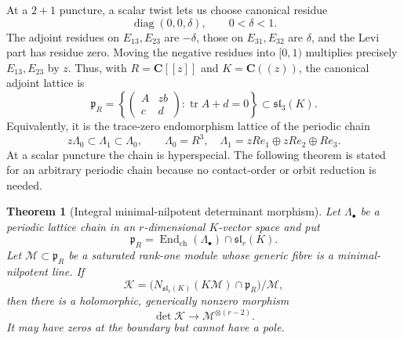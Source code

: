 \documentclass[11pt]{article}
\newtheorem{theorem}{Theorem}[section]
\theoremstyle{definition}
\newcommand{\C}{\mathbf C}
\newcommand{\Mcal}{\mathcal M}
\newcommand{\Kcal}{\mathcal K}
\newcommand{\End}{\operatorname{End}}
\newcommand{\tr}{\operatorname{tr}}
\begin{document}
At a $2+1$ puncture, a scalar twist lets us choose canonical residue
\[
 \operatorname{diag}(0,0,\delta),\qquad 0<\delta<1.
\]
The adjoint residues on $E_{13},E_{23}$ are $-\delta$, those on
$E_{31},E_{32}$ are $\delta$, and the Levi part has residue zero.  Moving the
negative residues into $[0,1)$ multiplies precisely $E_{13},E_{23}$ by $z$.
Thus, with $R=\C[[z]]$ and $K=\C((z))$, the canonical adjoint lattice is
\[
 \mathfrak p_R=
 \left\{
 \begin{pmatrix}A&zb\\c&d\end{pmatrix}:\tr A+d=0
 \right\}\subset\mathfrak{sl}_3(K).
\]
Equivalently, it is the trace-zero endomorphism lattice of the periodic chain
\[
 z\Lambda_0\subset\Lambda_1\subset\Lambda_0,
 \qquad
 \Lambda_0=R^3,
 \quad
 \Lambda_1=zRe_1\oplus zRe_2\oplus Re_3.
\]
At a scalar puncture the chain is hyperspecial.  The following theorem is
stated for an arbitrary periodic chain because no contact-order or orbit
reduction is needed.

\begin{theorem}[Integral minimal-nilpotent determinant morphism]
\label{thm:integral-det}
Let $\Lambda_\bullet$ be a periodic lattice chain in an $r$-dimensional
$K$-vector space and put
\[
 \mathfrak p_R=\End_{\mathrm{ch}}(\Lambda_\bullet)\cap\mathfrak{sl}_r(K).
\]
Let $\Mcal\subset\mathfrak p_R$ be a saturated rank-one module whose generic
fibre is a minimal-nilpotent line.  If
\[
 \Kcal=
 \bigl(N_{\mathfrak{sl}_r(K)}(K\Mcal)\cap\mathfrak p_R\bigr)/\Mcal,
\]
then there is a holomorphic, generically nonzero morphism
\[
 \det\Kcal\longrightarrow\Mcal^{\otimes(r-2)}.
\]
It may have zeros at the boundary but cannot have a pole.
\end{theorem}
\end{document}
